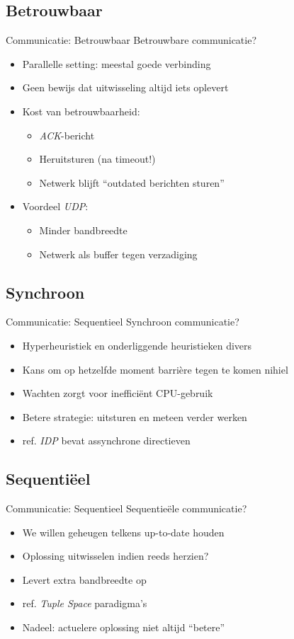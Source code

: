 \documentclass[handout]{beamer}
\begin{document}
\subsection{Betrouwbaar}
\begin{frame}{Communicatie: Betrouwbaar}
Betrouwbare communicatie?
\begin{itemize}[<+->]
 \item Parallelle setting: meestal goede verbinding
 \item Geen bewijs dat uitwisseling altijd iets oplevert
 \item Kost van betrouwbaarheid:
 \begin{itemize}[<+->]
  \item \emph{ACK}-bericht
  \item Heruitsturen (na timeout!)
  \item Netwerk blijft ``outdated berichten sturen''
 \end{itemize}
 \item Voordeel \emph{UDP}:
 \begin{itemize}
  \item Minder bandbreedte
  \item Netwerk als buffer tegen verzadiging
 \end{itemize}
\end{itemize}
\end{frame}
\subsection{Synchroon}
\begin{frame}{Communicatie: Sequentieel}
Synchroon communicatie?
\begin{itemize}[<+->]
 \item Hyperheuristiek en onderliggende heuristieken divers
 \item Kans om op hetzelfde moment barri\`ere tegen te komen nihiel
 \item Wachten zorgt voor ineffici\"ent CPU-gebruik
 \item Betere strategie: uitsturen en meteen verder werken
 \item ref. \emph{IDP} bevat assynchrone directieven
\end{itemize}
\end{frame}
\subsection{Sequenti\"eel}
\begin{frame}{Communicatie: Sequentieel}
Sequentie\"ele communicatie?
\begin{itemize}[<+->]
 \item We willen geheugen telkens up-to-date houden
 \item Oplossing uitwisselen indien reeds herzien?
 \item Levert extra bandbreedte op
 \item ref. \emph{Tuple Space} paradigma's
 \item Nadeel: actuelere oplossing niet altijd ``betere''
\end{itemize}
\end{frame}
\end{document}
